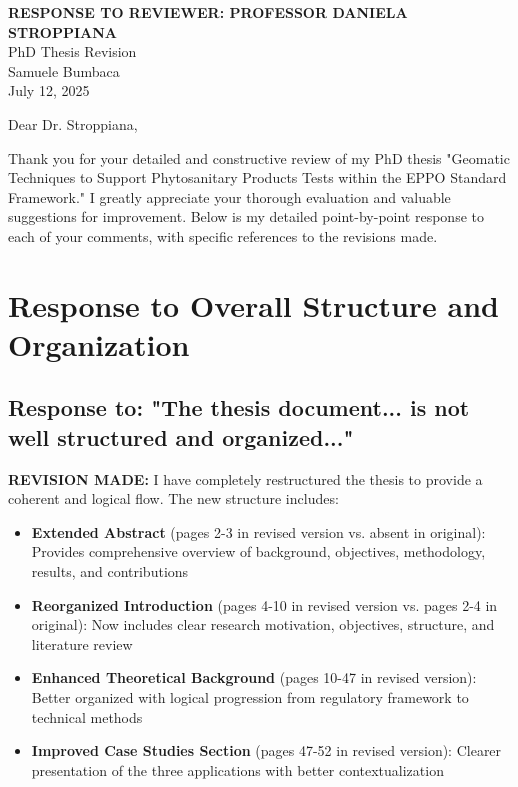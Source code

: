 \documentclass[11pt,a4paper]{article}
\begin{document}
\begin{center}
{\LARGE\bfseries RESPONSE TO REVIEWER: PROFESSOR DANIELA STROPPIANA}\\[0.5cm]
{\large PhD Thesis Revision}\\[0.3cm]
{\normalsize Samuele Bumbaca}\\[0.2cm]
{\normalsize July 12, 2025}
\end{center}

\vspace{1cm}

Dear Dr. Stroppiana,

Thank you for your detailed and constructive review of my PhD thesis "Geomatic Techniques to Support Phytosanitary Products Tests within the EPPO Standard Framework." I greatly appreciate your thorough evaluation and valuable suggestions for improvement. Below is my detailed point-by-point response to each of your comments, with specific references to the revisions made.

\section{Response to Overall Structure and Organization}

\subsection{Response to: "The thesis document... is not well structured and organized..."}

\textbf{REVISION MADE:} I have completely restructured the thesis to provide a coherent and logical flow. The new structure includes:

\begin{itemize}
\item \textbf{Extended Abstract} (pages 2-3 in revised version vs. absent in original): Provides comprehensive overview of background, objectives, methodology, results, and contributions
\item \textbf{Reorganized Introduction} (pages 4-10 in revised version vs. pages 2-4 in original): Now includes clear research motivation, objectives, structure, and literature review
\item \textbf{Enhanced Theoretical Background} (pages 10-47 in revised version): Better organized with logical progression from regulatory framework to technical methods
\item \textbf{Improved Case Studies Section} (pages 47-52 in revised version): Clearer presentation of the three applications with better contextualization
\end{itemize}
\end{document}
